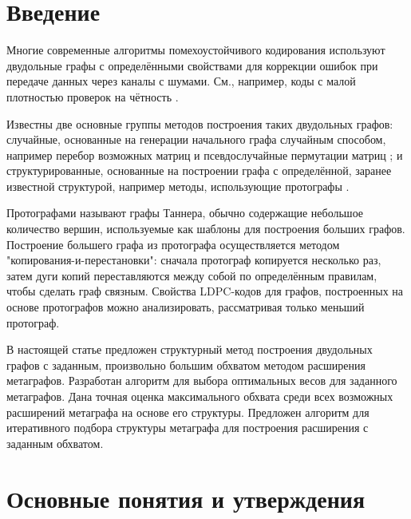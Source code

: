 \documentclass[14pt]{mmcs-article}
\begin{document}
\renewcommand{\mod}[1]{\textrm{mod}\ #1}

\section{Введение}

Многие современные алгоритмы помехоустойчивого кодирования используют двудольные графы с определёнными свойствами для коррекции ошибок при передаче данных через каналы с шумами. См., например, коды с малой плотностью проверок на чётность \cite{LDPC}. 


Известны две основные группы методов построения таких двудольных графов: случайные, основанные на генерации начального графа случайным способом, например перебор возможных матриц \cite{bruteforce} и псевдослучайные пермутации матриц \cite{gallager}; и структурированные, основанные на построении графа с определённой, заранее известной структурой, например методы, использующие протографы \cite{protographs}.

Протографами называют графы Таннера, обычно содержащие небольшое количество вершин, используемые как шаблоны для построения больших графов. Построение большего графа из протографа осуществляется методом "копирования-и-перестановки": сначала протограф копируется несколько раз, затем дуги копий переставляются между собой по определённым правилам, чтобы сделать граф связным. Свойства LDPC-кодов для графов, построенных на основе протографов можно анализировать, рассматривая только меньший протограф.


В настоящей статье предложен структурный метод построения двудольных графов с заданным, произвольно большим обхватом методом расширения метаграфов. Разработан алгоритм для выбора оптимальных весов для заданного метаграфов. Дана точная оценка максимального обхвата среди всех возможных расширений метаграфа на основе его структуры. Предложен алгоритм для итеративного подбора структуры метаграфа для построения расширения с заданным обхватом.

\section{Основные понятия и утверждения}
\end{document}
